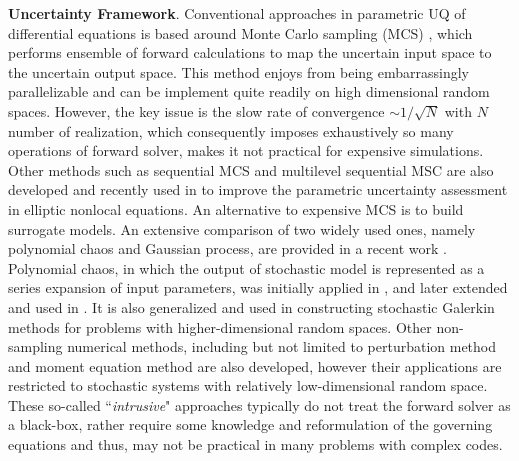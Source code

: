 \vspace{0.1 in}
%
\noindent\textbf{Uncertainty Framework}.
%
Conventional approaches in parametric UQ of differential equations is based around Monte Carlo sampling (MCS) \cite{carlo1996concepts}, which performs ensemble of forward calculations to map the uncertain input space to the uncertain output space.
This method enjoys from being embarrassingly parallelizable and can be implement quite readily on high dimensional random spaces. However, the key issue is the slow rate of convergence $\sim 1/\sqrt{N}$ with $N$ number of realization, which consequently imposes exhaustively so many operations of forward solver, makes it not practical for expensive simulations. Other methods such as sequential MCS \cite{del2006sequential} and multilevel sequential MSC \cite{beskos2017multilevel} are also developed and recently used in \cite{jasra2016forward} to improve the parametric uncertainty assessment in elliptic nonlocal equations. An alternative to expensive MCS is to build surrogate models. An extensive comparison of two widely used ones, namely polynomial chaos and Gaussian process, are provided in a recent work \cite{owen2017comparison}. Polynomial chaos, in which the output of stochastic model is represented as a series expansion of input parameters, was initially applied in \cite{ghanem2003stochastic}, and later extended and used in \cite{xiu2002modeling,xiu2002wiener,knio2006uncertainty}. It is also generalized and used in constructing stochastic Galerkin methods \cite{babuska2004galerkin,babuvska2005solving,le2004uncertainty,le2004multi} for problems with higher-dimensional random spaces. Other non-sampling numerical methods, including but not limited to perturbation method \cite{schuss1980singular,babuvska2002solving,todor2005sparse,winter2002groundwater} and moment equation method \cite{liu1986probabilistic,liu1986random} are also developed, however their applications are restricted to stochastic systems with relatively low-dimensional random space. These so-called ``\textit{intrusive}" approaches typically do not treat the forward solver as a black-box, rather require some knowledge and reformulation of the governing equations and thus, may not be practical in many problems with complex codes.

